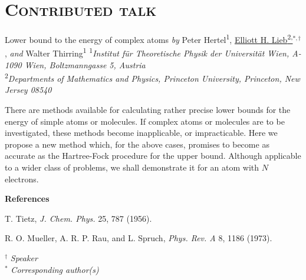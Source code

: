 \documentclass[12pt]{book}
\newenvironment{conf-abstract}[4][]{
  \needspace{10\baselineskip}
  \begin{center}
    { \renewcommand\textsuperscript[1]{}
      \phantomsection\addcontentsline{toc}{section}
      {\texorpdfstring{#2 (\emph{#3})}{#2 (#3)}}
    }
    {{\large\bfseries #2}\marginnote{#1}\par}
    \bigskip\smallskip
    {#3\par}
    \smallskip
    {\small #4\par}
  \end{center}
}{%
  \bigskip
  \hrule
  \bigskip
}
\newcommand{\indexauthors}[1]{%
  \forcsvlist{\index}{#1}
}
\begin{document}
\section{\textsc{Contributed talk}}

\noindent \hrulefill

\begin{conf-abstract}[CT-XX] %
{Lower bound to the energy of complex atoms}  
{\textit{by} Peter Hertel\textsuperscript{1}, \href{mailto:lieb@math.princeton.edu}{Elliott H. Lieb\textsuperscript{2,}$^{*,\dag}$}, \textit{and} Walter Thirring\textsuperscript{1}} %
{\textsuperscript{1}\textit{Institut für Theoretische Physik der Universität Wien, A-1090 Wien, Boltzmanngasse 5, Austria}\\ 
{\textsuperscript{2}\textit{Departments of Mathematics and Physics, Princeton University, Princeton, New Jersey 08540}}\\
}
\indexauthors{lieb}

There are methods available for calculating rather precise lower bounds for the energy of simple atoms or molecules. If complex atoms or molecules are to be investigated, these methods become inapplicable, or impracticable. Here we propose a new method which, for the above cases, promises to become as accurate as the Hartree-Fock procedure for the upper bound. Although applicable to a wider class of problems, we shall demonstrate it for an atom with $N$ electrons.


{\small{
{$\;$\\\bf References}%
\begin{enumerate}[label={[\arabic*]}]
\item T. Tietz, \textit{J. Chem. Phys.} 25, 787 (1956).
\vspace*{-0.3cm}\item R. O. Mueller, A. R. P. Rau, and L. Spruch, \textit{Phys. Rev. A} 8, 1186 (1973).
\end{enumerate}
}}

\noindent $^\dag$ \textit{Speaker}\\
$^*$ \textit{Corresponding author(s)}

\end{conf-abstract}
 
\end{document}
